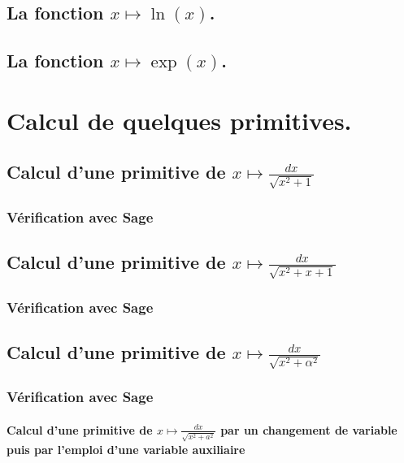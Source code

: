 \documentclass[a4paper,14pt]{extreport} %
\begin{document}
\section{La fonction  $x \mapsto \ln(x) $.}



\section{La fonction  $x \mapsto \exp(x) $.}



\chapter{Calcul de quelques primitives.}


\section{Calcul d'une primitive de $ x \longmapsto  \frac{dx}{\sqrt{x^2 + 1} } $ }

\subsection{Vérification avec Sage}

\section{Calcul d'une primitive de $  x \longmapsto  \frac{dx}{\sqrt{x^2+ x + 1} } $ }

\subsection{Vérification avec Sage}

\section{Calcul d'une primitive de $  x \longmapsto  \frac{dx}{\sqrt{x^2+ \alpha^2} } $ }

\subsection{Vérification avec Sage}



\subsubsection{Calcul d'une primitive de $  x \longmapsto  \frac{dx}{\sqrt{x^2+ a^2} } $ par un changement de variable puis par l'emploi d'une variable auxiliaire} 
\end{document}
